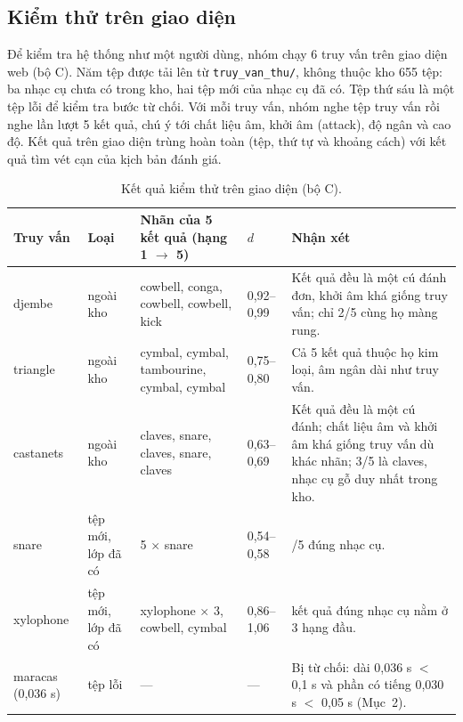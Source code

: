 
\subsection{Kiểm thử trên giao diện}\label{sec:kiemthugd}
Để kiểm tra hệ thống như một người dùng, nhóm chạy 6 truy vấn trên giao diện web (bộ C). Năm tệp được tải lên từ \texttt{truy\_van\_thu/}, không thuộc kho 655 tệp: ba nhạc cụ chưa có trong kho, hai tệp mới của nhạc cụ đã có. Tệp thứ sáu là một tệp lỗi để kiểm tra bước từ chối. Với mỗi truy vấn, nhóm nghe tệp truy vấn rồi nghe lần lượt 5 kết quả, chú ý tới chất liệu âm, khởi âm (attack), độ ngân và cao độ. Kết quả trên giao diện trùng hoàn toàn (tệp, thứ tự và khoảng cách) với kết quả tìm vét cạn của kịch bản đánh giá.

\begin{table}[htbp]
\centering\footnotesize
\caption{Kết quả kiểm thử trên giao diện (bộ C).}\label{tab:kiemthugd}
\begin{tabularx}{\textwidth}{@{}>{\raggedright}p{1.6cm}>{\raggedright}p{1.7cm}>{\raggedright}p{3.9cm}p{1.45cm}>{\raggedright\arraybackslash}X@{}}
\toprule
Truy vấn & Loại & Nhãn của 5 kết quả (hạng 1 $\to$ 5) & $d$ & Nhận xét\\\midrule
djembe & ngoài kho & cowbell, conga, cowbell, cowbell, kick & 0,92--0,99 & Kết quả đều là một cú đánh đơn, khởi âm khá giống truy vấn; chỉ 2/5 cùng họ màng rung.\\
triangle & ngoài kho & cymbal, cymbal, tambourine, cymbal, cymbal & 0,75--0,80 & Cả 5 kết quả thuộc họ kim loại, âm ngân dài như truy vấn.\\
castanets & ngoài kho & claves, snare, claves, snare, claves & 0,63--0,69 & Kết quả đều là một cú đánh; chất liệu âm và khởi âm khá giống truy vấn dù khác nhãn; 3/5 là claves, nhạc cụ gỗ duy nhất trong kho.\\
snare & tệp mới, lớp đã có & 5 $\times$ snare & 0,54--0,58 & 5/5 đúng nhạc cụ.\\
xylophone & tệp mới, lớp đã có & xylophone $\times$ 3, cowbell, cymbal & 0,86--1,06 & 3 kết quả đúng nhạc cụ nằm ở 3 hạng đầu.\\
maracas (0,036 s) & tệp lỗi & --- & --- & Bị từ chối: dài 0,036 s $<$ 0,1 s và phần có tiếng 0,030 s $<$ 0,05 s (Mục~2).\\\bottomrule
\end{tabularx}
\end{table}

